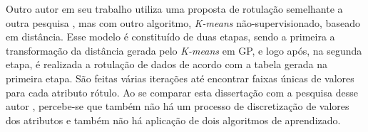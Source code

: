 Outro autor  \cite{Imperes2018a} em seu trabalho utiliza uma proposta de rotulação semelhante a outra pesquisa \cite{Filho2015}, mas com outro algoritmo, \textit{K-means} não-supervisionado, baseado em distância. Esse modelo é constituído de duas etapas, sendo a primeira a transformação da distância gerada pelo \textit{K-means} em GP, e logo após, na segunda etapa, é realizada a rotulação de dados de acordo com a tabela gerada na primeira etapa. São feitas várias iterações até encontrar faixas únicas de valores para cada atributo rótulo. Ao se comparar esta dissertação com a pesquisa desse autor \cite{Imperes2018a}, percebe-se que também não há um processo de discretização de valores dos atributos e também não há aplicação de dois algoritmos de aprendizado. 


